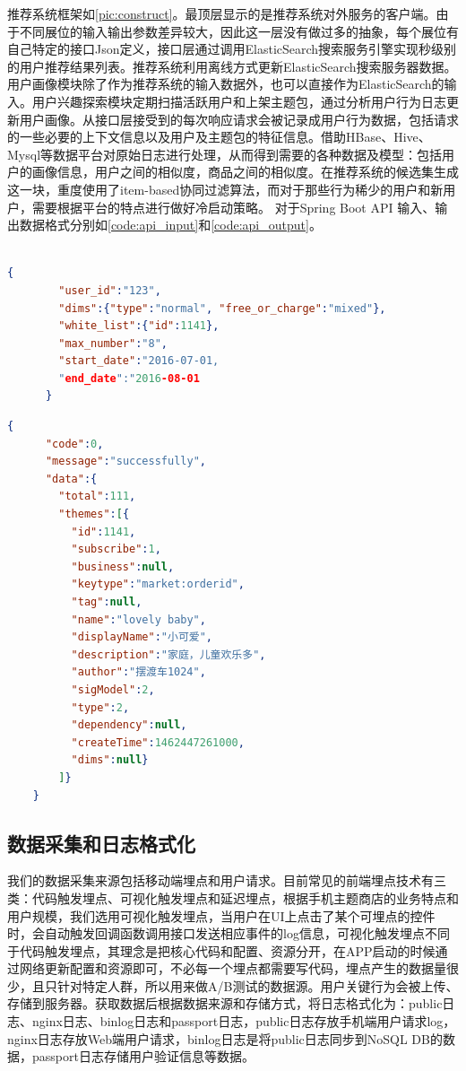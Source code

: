     推荐系统框架如\autoref{pic:construct}。最顶层显示的是推荐系统对外服务的客户端。由于不同展位的输入输出参数差异较大，因此这一层没有做过多的抽象，每个展位有自己特定的接口Json定义，接口层通过调用ElasticSearch搜索服务引擎实现秒级别的用户推荐结果列表。推荐系统利用离线方式更新ElasticSearch搜索服务器数据。用户画像模块除了作为推荐系统的输入数据外，也可以直接作为ElasticSearch的输入。用户兴趣探索模块定期扫描活跃用户和上架主题包，通过分析用户行为日志更新用户画像。从接口层接受到的每次响应请求会被记录成用户行为数据，包括请求的一些必要的上下文信息以及用户及主题包的特征信息。借助HBase、Hive、Mysql等数据平台对原始日志进行处理，从而得到需要的各种数据及模型：包括用户的画像信息，用户之间的相似度，商品之间的相似度。在推荐系统的候选集生成这一块，重度使用了item-based协同过滤算法，而对于那些行为稀少的用户和新用户，需要根据平台的特点进行做好冷启动策略。
    对于Spring Boot API 输入、输出数据格式分别如\autoref{code:api_input}和\autoref{code:api_output}。\\\\
    \begin{lstlisting}[language=json,firstnumber=1,label={code:api_input}, caption={Spring Boot API 输入格式}]
      {
        "user_id":"123",
        "dims":{"type":"normal", "free_or_charge":"mixed"},
        "white_list":{"id":1141},
        "max_number":"8",
        "start_date":"2016-07-01,
        "end_date":"2016-08-01
      }
    \end{lstlisting}

    \begin{lstlisting}[language=json,firstnumber=1,label={code:api_output}, caption={Spring Boot API 输出格式}]
    {
      "code":0,
      "message":"successfully",
      "data":{
        "total":111,
        "themes":[{
          "id":1141,
          "subscribe":1,
          "business":null,
          "keytype":"market:orderid",
          "tag":null,
          "name":"lovely baby",
          "displayName":"小可爱",
          "description":"家庭，儿童欢乐多",
          "author":"摆渡车1024",
          "sigModel":2,
          "type":2,
          "dependency":null,
          "createTime":1462447261000,
          "dims":null}
        ]}
    }
    \end{lstlisting}

    \subsection{数据采集和日志格式化}
    我们的数据采集来源包括移动端埋点和用户请求。目前常见的前端埋点技术有三类：代码触发埋点、可视化触发埋点和延迟埋点，根据手机主题商店的业务特点和用户规模，我们选用可视化触发埋点，当用户在UI上点击了某个可埋点的控件时，会自动触发回调函数调用接口发送相应事件的log信息，可视化触发埋点不同于代码触发埋点，其理念是把核心代码和配置、资源分开，在APP启动的时候通过网络更新配置和资源即可，不必每一个埋点都需要写代码，埋点产生的数据量很少，且只针对特定人群，所以用来做A/B测试的数据源。用户关键行为会被上传、存储到服务器。获取数据后根据数据来源和存储方式，将日志格式化为：public日志、nginx日志、binlog日志和passport日志，public日志存放手机端用户请求log，nginx日志存放Web端用户请求，binlog日志是将public日志同步到NoSQL DB的数据，passport日志存储用户验证信息等数据。

